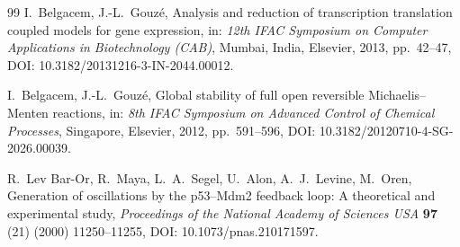 \documentclass[sn-mathphys,Numbered]{sn-jnl}
\theoremstyle{thmstyleone}
\theoremstyle{thmstyletwo}
\theoremstyle{thmstylethree}
\begin{document}
\begin{thebibliography}{99}
I.~Belgacem, J.-L.~Gouz\'e,
Analysis and reduction of transcription translation coupled models for
gene expression,
in: \emph{12th IFAC Symposium on Computer Applications in Biotechnology
(CAB)}, Mumbai, India, Elsevier, 2013, pp.~42--47,
DOI: 10.3182/20131216-3-IN-2044.00012.

I.~Belgacem, J.-L.~Gouz\'e,
Global stability of full open reversible Michaelis--Menten reactions,
in: \emph{8th IFAC Symposium on Advanced Control of Chemical Processes},
Singapore, Elsevier, 2012, pp.~591--596,
DOI: 10.3182/20120710-4-SG-2026.00039.

R.~Lev Bar-Or, R.~Maya, L.~A.~Segel, U.~Alon, A.~J.~Levine, M.~Oren,
Generation of oscillations by the p53--Mdm2 feedback loop:
A theoretical and experimental study,
\emph{Proceedings of the National Academy of Sciences USA}
\textbf{97} (21) (2000) 11250--11255,
DOI: 10.1073/pnas.210171597.

\end{thebibliography}
\end{document}

